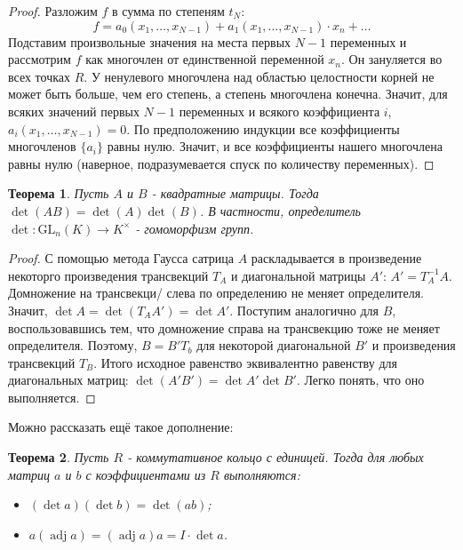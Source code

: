 \documentclass[a4paper,100pt]{article}
\theoremstyle{indented}
\newtheorem{theorem}{Теорема}
\theoremstyle{definition}
\theoremstyle{remark}
\DeclareMathOperator{\adj}{adj}
\begin{document}
\begin{proof}
    Разложим $f$ в сумма по степеням $t_N$:
    \[
        f=a_0(x_1, \dots, x_{N-1})+a_1(x_1, \dots, x_{N-1})\cdot x_n+\dots
    \]
    Подставим произвольные значения на места первых $N-1$ переменных и рассмотрим $f$ как многочлен от единственной переменной $x_n$. Он зануляется во всех точках $R$. У ненулевого многочлена над областью целостности корней не может быть больше, чем его степень, а степень многочлена конечна. Значит, для всяких значений первых $N-1$ переменных и всякого коэффициента $i$, $a_i(x_1, \dots,x_{N-1})=0$. По предположению индукции все коэффициенты многочленов $\{a_i\}$ равны нулю. Значит, и все коэффициенты нашего многочлена равны нулю (наверное, подразумевается спуск по количеству переменных).
\end{proof}

\begin{theorem}
    Пусть $A$ и $B$ - квадратные матрицы. Тогда $\det (AB)=\det(A)\det(B)$. В частности, определитель $\det: \text{GL}_n(K)\rightarrow K^\times$ - гомоморфизм групп.
\end{theorem}

\begin{proof}
    С помощью метода Гаусса сатрица $A$ раскладывается в произведение некоторго произведения трансвекций $T_A$ и диагональной матрицы $A'$: $A'=T_A^{-1}A$. Домножение на трансвекци/ слева по определению не меняет определителя. Значит, $\det A=\det(T_A A')=\det A'$. Поступим аналогично для $B$, воспользовавшись тем, что домножение справа на трансвекцию тоже не меняет определителя. Поэтому, $B=B'T_b$ для некоторой диагональной $B'$ и произведения трансвекций $T_B$. Итого исходное равенство эквивалентно равенству для диагональных матриц: $\det(A'B')=\det A'\det B'$. Легко понять, что оно выполняется.
\end{proof}

Можно рассказать ещё такое дополнение:\\

\begin{theorem}
    Пусть $R$ - коммутативное кольцо с единицей. Тогда для любых матриц $a$ и $b$ с коэффициентами из $R$ выполняются:\ 

    \begin{itemize}
        \item $(\det a)(\det b)=\det (ab)$;
        \item $a(\adj a)=(\adj a)a=I\cdot \det a$.
    \end{itemize}
\end{theorem}
\end{document}
